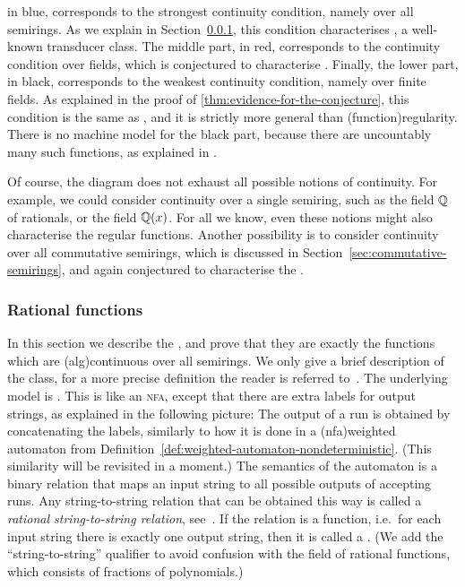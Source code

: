 in blue, corresponds to the strongest continuity condition, namely over all
semirings. As we explain in Section~\ref{sec:rational-functions}, this
condition characterises , a well-known transducer class.
The middle part, in red, corresponds to the continuity condition over fields,
which is conjectured to characterise . Finally, the lower
part, in black, corresponds to the weakest continuity condition, namely over
finite fields. As explained in the proof of
\cref{thm:evidence-for-the-conjecture}, this condition is the same as
, and it is strictly more general than
\kl(function){regularity}. There is no machine model for the black part,
because there are uncountably many such functions, as explained in
\cite{bojanczykTitoRegular23}.

Of course, the diagram does not exhaust all possible notions of continuity. For
example, we could consider continuity over a single semiring, such as the field
${\mathbb Q}$ of rationals, or the field ${\mathbb Q}(x)$. For all we know, even these
notions might also characterise the regular functions. Another possibility is
to consider continuity over all commutative semirings, which is discussed in
Section~\ref{sec:commutative-semirings}, and again conjectured to characterise
the .

\subsubsection{Rational functions}
\label{sec:rational-functions}
\AP
In this section we describe the , and
prove that they are exactly the functions which are \kl(alg){continuous} over all
semirings.  We only give a brief description of the class, for a more precise
definition the reader is referred to~\cite[Section
14.2]{bojanczyk_automata_2025}. The underlying model is . This is like an \textsc{nfa}, except
that there are extra labels for output strings, as  explained in the following
picture: 
The output of a run is obtained by concatenating the labels, similarly to how
it is done in a \kl(nfa){weighted automaton} from
Definition~\ref{def:weighted-automaton-nondeterministic}. (This similarity will
be revisited in a moment.) The semantics of the automaton is a binary relation
that maps an input string to all possible outputs of accepting runs. Any
string-to-string relation that can be obtained this way is called a
\emph{rational string-to-string relation}, see~\cite[Chapter IX]{Eilenberg74}.
If the relation is a function, i.e.~for each input string there is exactly one
output string, then it is called a .
(We add the ``string-to-string'' qualifier to avoid confusion with the field
of rational functions, which consists of fractions of polynomials.)  

